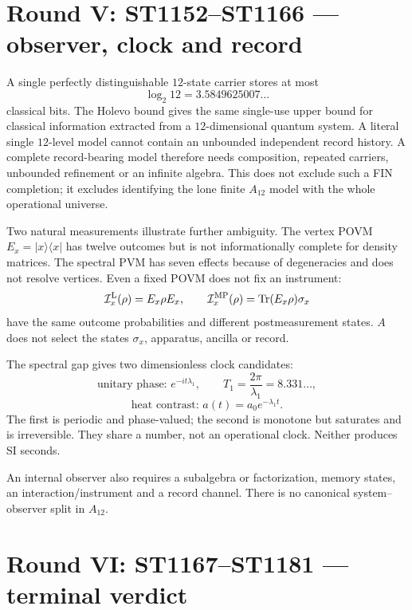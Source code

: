 \documentclass[11pt,a4paper]{article}
\begin{document}
\section{Round V: ST1152--ST1166 --- observer, clock and record}

A single perfectly distinguishable $12$-state carrier stores at most
\[
 \log_2 12=3.5849625007\ldots
\]
classical bits.  The Holevo bound gives the same single-use upper bound for
classical information extracted from a $12$-dimensional quantum system.  A
literal single $12$-level model cannot contain an unbounded independent record
history.  A complete record-bearing model therefore needs composition,
repeated carriers, unbounded refinement or an infinite algebra.  This does not
exclude such a FIN completion; it excludes identifying the lone finite
$A_{12}$ model with the whole operational universe.

Two natural measurements illustrate further ambiguity.  The vertex POVM
$E_x=|x\rangle\langle x|$ has twelve outcomes but is not informationally
complete for density matrices.  The spectral PVM has seven effects because of
degeneracies and does not resolve vertices.  Even a fixed POVM does not fix an
instrument:
\[
 \mathcal I_x^{\rm L}(\rho)=E_x\rho E_x,
 \qquad
 \mathcal I_x^{\rm MP}(\rho)=\operatorname{Tr}(E_x\rho)\sigma_x
\]
have the same outcome probabilities and different postmeasurement states.
$A$ does not select the states $\sigma_x$, apparatus, ancilla or record.

The spectral gap gives two dimensionless clock candidates:
\[
 \text{unitary phase: }e^{-it\lambda_1},
 \qquad T_1=\frac{2\pi}{\lambda_1}=8.331\ldots,
\]
\[
 \text{heat contrast: }a(t)=a_0e^{-\lambda_1t}.
\]
The first is periodic and phase-valued; the second is monotone but saturates
and is irreversible.  They share a number, not an operational clock.  Neither
produces SI seconds.

An internal observer also requires a subalgebra or factorization, memory
states, an interaction/instrument and a record channel.  There is no canonical
system--observer split in $A_{12}$.

\section{Round VI: ST1167--ST1181 --- terminal verdict}
\end{document}
